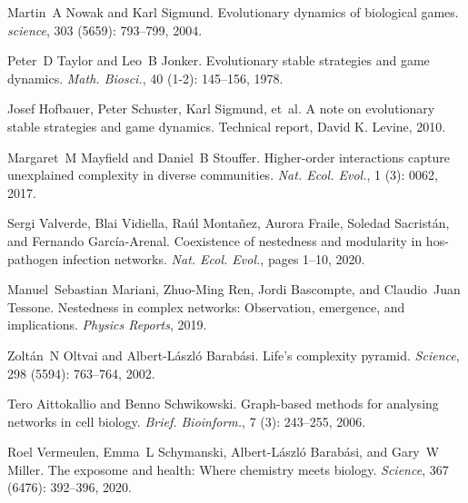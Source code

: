 Martin~A Nowak and Karl Sigmund.
\newblock Evolutionary dynamics of biological games.
\newblock \emph{science}, 303 (5659): 793--799, 2004.

Peter~D Taylor and Leo~B Jonker.
\newblock Evolutionary stable strategies and game dynamics.
\newblock \emph{Math. Biosci.}, 40 (1-2): 145--156, 1978.

Josef Hofbauer, Peter Schuster, Karl Sigmund, et~al.
\newblock A note on evolutionary stable strategies and game dynamics.
\newblock Technical report, {David K. Levine}, 2010.

Margaret~M Mayfield and Daniel~B Stouffer.
\newblock Higher-order interactions capture unexplained complexity in diverse
communities.
\newblock \emph{Nat. Ecol. Evol.}, 1 (3): 0062, 2017.

Sergi Valverde, Blai Vidiella, Ra{\'u}l Monta{\~n}ez, Aurora Fraile, Soledad
Sacrist{\'a}n, and Fernando {Garc{\'i}a-Arenal}.
\newblock Coexistence of nestedness and modularity in hos-pathogen
infection networks.
\newblock \emph{Nat. Ecol. Evol.}, pages 1--10, 2020.

Manuel~Sebastian Mariani, Zhuo-Ming Ren, Jordi Bascompte, and Claudio~Juan
Tessone.
\newblock Nestedness in complex networks: Observation, emergence, and
implications.
\newblock \emph{Physics Reports}, 2019.

Zolt{\'a}n~N Oltvai and Albert-L{\'a}szl{\'o} Barab{\'a}si.
\newblock Life's complexity pyramid.
\newblock \emph{Science}, 298 (5594): 763--764, 2002.

Tero Aittokallio and Benno Schwikowski.
\newblock Graph-based methods for analysing networks in cell biology.
\newblock \emph{Brief. Bioinform.}, 7 (3): 243--255, 2006.

Roel Vermeulen, Emma~L Schymanski, Albert-L{\'a}szl{\'o} Barab{\'a}si, and
Gary~W Miller.
\newblock The exposome and health: {{Where}} chemistry meets biology.
\newblock \emph{Science}, 367 (6476): 392--396, 2020.

